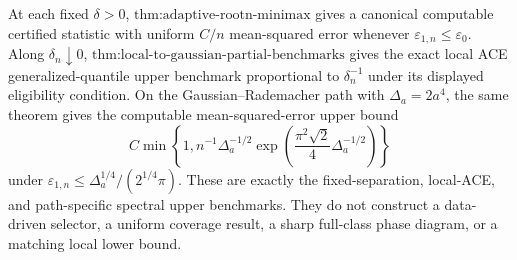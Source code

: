 At each fixed \(\delta>0\), \(\text{thm:adaptive-rootn-minimax}\) gives a canonical computable certified statistic with uniform \(C/n\) mean-squared error whenever \(\varepsilon_{1,n}\le\varepsilon_0\).  Along \(\delta_n\downarrow0\), \(\text{thm:local-to-gaussian-partial-benchmarks}\) gives the exact local ACE generalized-quantile upper benchmark proportional to \(\delta_n^{-1}\) under its displayed eligibility condition.  On the Gaussian--Rademacher path with \(\Delta_a=2a^4\), the same theorem gives the computable mean-squared-error upper bound
\[
 C\min\!\left\{1,n^{-1}\Delta_a^{-1/2}
 \exp\!\left(\frac{\pi^2\sqrt2}{4}\Delta_a^{-1/2}\right)\right\}
\]
under \(\varepsilon_{1,n}\le\Delta_a^{1/4}/(2^{1/4}\pi)\).  These are exactly the fixed-separation, local-ACE, and path-specific spectral upper benchmarks.  They do not construct a data-driven selector, a uniform coverage result, a sharp full-class phase diagram, or a matching local lower bound.